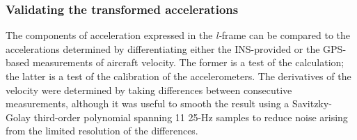 \documentclass[12pt,twoside,english,12pt,twoside,english]{article}\usepackage[]{graphicx}\usepackage[]{color}
\let\OrgIndex\index
\renewcommand*{\index}[1]{\OrgIndex{#1}}
\begin{document}
\subsubsection{Validating the transformed accelerations\label{subsec:Checking-accelerations} }





The components of acceleration
 expressed in the \emph{l-}frame
can be compared to the accelerations determined by differentiating
either the INS-provided or the GPS-based
measurements of aircraft velocity. The
former is a test of the calculation; the latter is a test of the calibration
of the accelerometers. The derivatives of the velocity
were determined by taking differences between consecutive measurements,
although it was useful to smooth the result using
a Savitzky-Golay
third-order polynomial spanning 11 25-Hz samples to reduce noise arising
from the limited resolution of the differences. 
\end{document}

